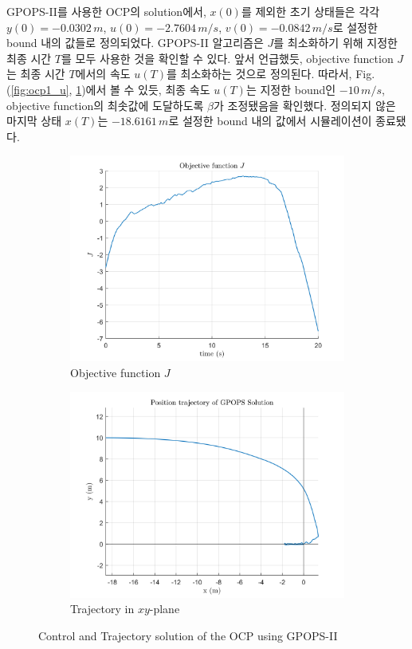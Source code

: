 GPOPS-II를 사용한 OCP의 solution에서, $x(0)$를 제외한 초기 상태들은 각각 $y(0) = -0.0302\,m$, $u(0) = -2.7604\,m/s$, $v(0) = -0.0842\,m/s$로 설정한 bound 내의 값들로 정의되었다.
GPOPS-II 알고리즘은 $J$를 최소화하기 위해 지정한 최종 시간 $T$를 모두 사용한 것을 확인할 수 있다.
앞서 언급했듯, objective function $J$는 최종 시간 $T$에서의 속도 $u(T)$를 최소화하는 것으로 정의된다.
따라서, Fig. (\ref{fig:ocp1_u}, \ref{fig:ocp1_obj})에서 볼 수 있듯, 최종 속도 $u(T)$는 지정한 bound인 $-10\,m/s$, objective function의 최솟값에 도달하도록 $\beta$가 조정됐음을 확인했다.
정의되지 않은 마지막 상태 $x(T)$는 $-18.6161\,m$로 설정한 bound 내의 값에서 시뮬레이션이 종료됐다.

\begin{figure}[ht]
    \centering
    \begin{subfigure}[b]{0.49\linewidth}
        \includegraphics[width=\linewidth]{figures/ObjFcn.png}
        \caption{Objective function $J$}
        \label{fig:ocp1_obj}
    \end{subfigure}
    \hfill
    \begin{subfigure}[b]{0.49\linewidth}
        \includegraphics[width=\linewidth]{figures/TrajXY.png}
        \caption{Trajectory in $xy$-plane}
        \label{fig:ocp1_xy}
    \end{subfigure}
    \caption{Control and Trajectory solution of the OCP using GPOPS-II}
    \label{fig:ocp1_control}
\end{figure}

